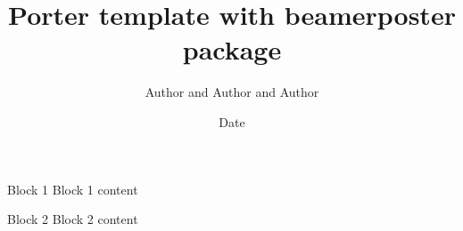 \documentclass[final]{beamer}
\title[Poster Template]{Porter template with beamerposter package}
\author[Authors]{Author and Author and Author}
\institute[NArFU]{Northern (Arctic) Federal University}
\date{Date}
\begin{document}
 \begin{frame}{} 

\maketitle

\begin{block}{\large Block 1}
Block 1 content
\end{block}
\bigskip

\begin{block}{\large Block 2}
Block 2 content
\end{block}
\bigskip

\end{frame} 
\end{document}

